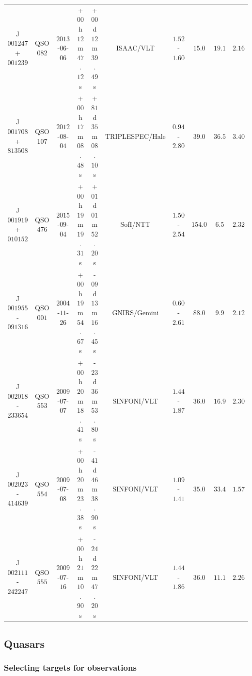 \begin{landscape}
\begin{minipage}{\linewidth}
\begin{tabular}{cccccccccc}
    J$001247$+$001239$  &  QSO$082$ & $2013$-$06$-$06$ &  +$00$h$12$m$47$.$12$s &  +$00$d$12$m$39$.$49$s &        ISAAC/VLT &  $1.52$-$1.60$ &      $15.0$ &  $19.1$ &  $2.16$ \\
    J$001708$+$813508$  &  QSO$107$ & $2012$-$08$-$04$ &  +$00$h$17$m$08$.$48$s &  +$81$d$35$m$08$.$10$s &  TRIPLESPEC/Hale &  $0.94$-$2.80$ &      $39.0$ &  $36.5$ &  $3.40$ \\
    J$001919$+$010152$  &  QSO$476$ & $2015$-$09$-$04$ &  +$00$h$19$m$19$.$31$s &  +$01$d$01$m$52$.$20$s &         SofI/NTT &  $1.50$-$2.54$ &     $154.0$ &   $6.5$ &  $2.32$ \\
    J$001955$-$091316$  &  QSO$001$ & $2004$-$11$-$26$ &  +$00$h$19$m$54$.$67$s &  -$09$d$13$m$16$.$45$s &     GNIRS/Gemini &  $0.60$-$2.61$ &      $88.0$ &   $9.9$ &  $2.12$ \\
    J$002018$-$233654$  &  QSO$553$ & $2009$-$07$-$07$ &  +$00$h$20$m$18$.$41$s &  -$23$d$36$m$53$.$80$s &      SINFONI/VLT &  $1.44$-$1.87$ &      $36.0$ &  $16.9$ &  $2.30$ \\
    J$002023$-$414639$  &  QSO$554$ & $2009$-$07$-$08$ &  +$00$h$20$m$23$.$38$s &  -$41$d$46$m$38$.$90$s &      SINFONI/VLT &  $1.09$-$1.41$ &      $35.0$ &  $33.4$ &  $1.57$ \\
    J$002111$-$242247$  &  QSO$555$ & $2009$-$07$-$16$ &  +$00$h$21$m$10$.$90$s &  -$24$d$22$m$47$.$20$s &      SINFONI/VLT &  $1.44$-$1.86$ &      $36.0$ &  $11.1$ &  $2.26$ \\
    \bottomrule
    \end{tabular}
    \end{minipage}
\end{landscape}

\subsection{\citet{coatman16} Quasars}

\subsubsection{Selecting targets for observations}

